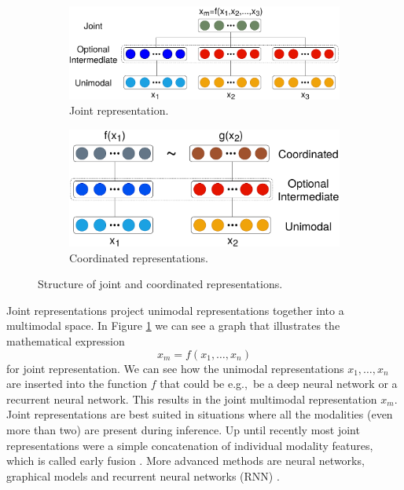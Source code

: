 \documentclass{article}
\begin{document}
\begin{figure}[H]
	\centering
	\begin{subfigure}[b]{0.54\linewidth}
		\includegraphics[width=\linewidth]{joint_reps.pdf}
		\caption{Joint representation.}
		\label{fig:reps1}	
	\end{subfigure}
	\begin{subfigure}[b]{0.43\linewidth}
		\includegraphics[width=\linewidth]{coordinated_reps.pdf}
		\caption{Coordinated representations.}
		\label{fig:reps2}	
	\end{subfigure}
	\caption{Structure of joint and coordinated representations.}
	\label{fig:reps}
\end{figure}

Joint representations project unimodal representations together into a multimodal space. In Figure \ref{fig:reps1} we can see a graph that illustrates the mathematical expression
\begin{equation}
x_m = f(x_1, \dots , x_n)
\end{equation}
for joint representation. We can see how the unimodal representations $x_1, \dots , x_n$ are inserted into the function $f$ that could be e.g.,\ be a deep neural network or a recurrent neural network. This results in the joint multimodal representation $x_m$.
Joint representations are best suited in situations where all the modalities (even more than two) are present during inference. Up until recently most joint representations were a simple concatenation of individual modality features, which is called early fusion \citep{dmello2015review}. More advanced methods are neural networks, graphical models and recurrent neural networks (RNN) \citep{elman1990finding}.
\end{document}
